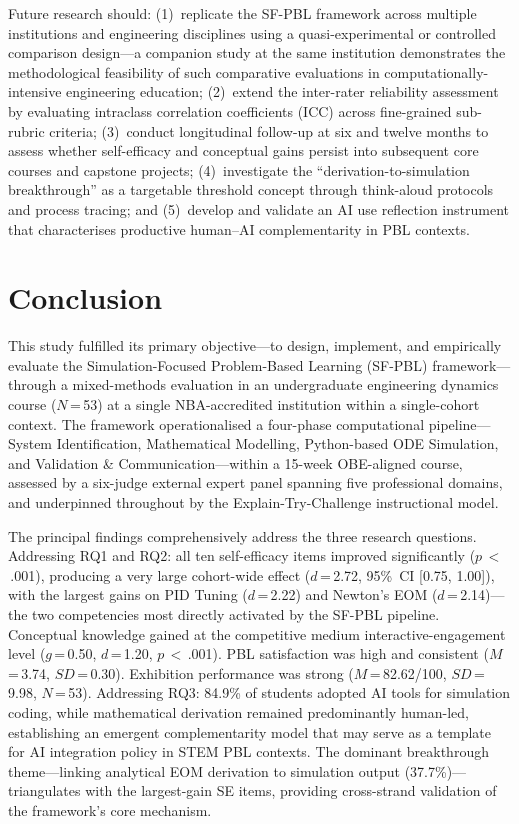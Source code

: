 \documentclass[utf8]{FrontiersinHarvard}
\begin{document}
Future research should: (1)~replicate the SF-PBL framework across multiple
institutions and engineering disciplines using a quasi-experimental or
controlled comparison design---a companion study at the same institution
\citep{nanade2026cross} demonstrates the methodological feasibility of such
comparative evaluations in computationally-intensive engineering education;
(2)~extend the inter-rater reliability assessment by evaluating intraclass
correlation coefficients (ICC) across fine-grained sub-rubric criteria;
(3)~conduct longitudinal follow-up at six and twelve months to assess whether
self-efficacy and conceptual gains persist into subsequent core courses and
capstone projects; (4)~investigate the ``derivation-to-simulation
breakthrough'' as a targetable threshold concept through think-aloud
protocols and process tracing; and (5)~develop and validate an AI use
reflection instrument that characterises productive human--AI
complementarity in PBL contexts.

\section{Conclusion}

This study fulfilled its primary objective---to design, implement, and
empirically evaluate the Simulation-Focused Problem-Based Learning (SF-PBL)
framework---through a mixed-methods evaluation in an undergraduate
engineering dynamics course ($N$\,=\,53) at a single NBA-accredited
institution within a single-cohort context. The framework operationalised
a four-phase computational pipeline---System Identification, Mathematical
Modelling, Python-based ODE Simulation, and Validation \&
Communication---within a 15-week OBE-aligned course, assessed by a six-judge
external expert panel spanning five professional domains, and underpinned
throughout by the Explain-Try-Challenge instructional model.

The principal findings comprehensively address the three research questions.
Addressing RQ1 and RQ2: all ten self-efficacy items improved significantly
($p$\,$<$\,.001), producing a very large cohort-wide effect ($d$\,=\,2.72,
95\%~CI [0.75, 1.00]), with the largest gains on PID Tuning ($d$\,=\,2.22)
and Newton's EOM ($d$\,=\,2.14)---the two competencies most directly
activated by the SF-PBL pipeline. Conceptual knowledge gained at the
competitive medium interactive-engagement level ($g$\,=\,0.50,
$d$\,=\,1.20, $p$\,$<$\,.001). PBL satisfaction was high and consistent
($M$\,=\,3.74, $SD$\,=\,0.30). Exhibition performance was strong
($M$\,=\,82.62/100, $SD$\,=\,9.98, $N$\,=\,53). Addressing RQ3: 84.9\%
of students adopted AI tools for simulation coding, while mathematical
derivation remained predominantly human-led, establishing an emergent
complementarity model that may serve as a template for AI integration
policy in STEM PBL contexts. The dominant breakthrough theme---linking
analytical EOM derivation to simulation output (37.7\%)---triangulates
with the largest-gain SE items, providing cross-strand validation of
the framework's core mechanism.
\end{document}
